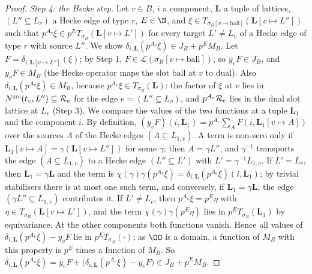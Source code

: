 \begin{proof}
\emph{Step 4: the Hecke step.} Let $v\in B$, $i$ a component, $\mathbf L$ a tuple of lattices, $(L''\subseteq L_v)$ a Hecke edge
of type $r$, $E\in\N$, and $\xi\in T_{\sigma_B[v\mapsto\mathrm{ball}]}(\mathbf L[v\mapsto L''])$ such that
$p^{A_v}\xi\in p^ET_{\sigma_B}(\mathbf L[v\mapsto L'])$ for every target $L'\ne L_v$ of a Hecke edge of type $r$ with source
$L''$. We show $\delta_{i,\mathbf L}(p^{A_v}\xi)\in J_B+p^EM_B$. Let $F=\delta_{i,\mathbf L[v\mapsto L'']}(\xi)$; by Step 1,
$F\in\mathcal L(\sigma_B[v\mapsto\mathrm{ball}])$, so $y_vF\in J_B$, and $y_vF\in M_B$ (the Hecke operator maps the slot
$\mathrm{ball}$ at $v$ to $\mathrm{dual}$). Also $\delta_{i,\mathbf L}(p^{A_v}\xi)\in M_B$, because $p^{A_v}\xi\in
T_{\sigma_B}(\mathbf L)$: the factor of $\xi$ at $v$ lies in $N^{\mathrm{src}}(t_v,L'')\subseteq\mathcal R_e$ for the edge $e=(L''\subseteq
L_v)$, and $p^{A_v}\mathcal R_e$ lies in the dual slot lattice at $L_v$ (Step 3). We compare the values of the two functions at a
tuple $\mathbf L_1$ and the component $i$. By definition,
$(y_vF)(i,\mathbf L_1)=p^{A_v}\sum_AF(i,\mathbf L_1[v\mapsto A])$ over the sources $A$ of the Hecke edges $(A\subseteq L_{1,v})$. A
term is non-zero only if $\mathbf L_1[v\mapsto A]=\gamma(\mathbf L[v\mapsto L''])$ for some $\gamma$; then $A=\gamma L''$, and
$\gamma^{-1}$ transports the edge $(A\subseteq L_{1,v})$ to a Hecke edge $(L''\subseteq L')$ with $L'=\gamma^{-1}L_{1,v}$. If
$L'=L_v$, then $\mathbf L_1=\gamma\mathbf L$ and the term is $\chi(\gamma)\gamma(p^{A_v}\xi)=\delta_{i,\mathbf L}(p^{A_v}\xi)(i,\mathbf L_1)$;
by trivial stabilisers there is at most one such term, and conversely, if $\mathbf L_1=\gamma\mathbf L$, the edge
$(\gamma L''\subseteq L_{1,v})$ contributes it. If $L'\ne L_v$, then $p^{A_v}\xi=p^E\eta$ with $\eta\in T_{\sigma_B}(\mathbf
L[v\mapsto L'])$, and the term $\chi(\gamma)\gamma(p^E\eta)$ lies in $p^ET_{\sigma_B}(\mathbf L_1)$ by equivariance. At the other
components both functions vanish. Hence all
values of $\delta_{i,\mathbf L}(p^{A_v}\xi)-y_vF$ lie in $p^ET_{\sigma_B}(\cdot)$; as $\OO$ is a domain, a function of $M_B$
with this property is $p^E$ times a function of $M_B$. So $\delta_{i,\mathbf L}(p^{A_v}\xi)=y_vF+\bigl(\delta_{i,\mathbf
L}(p^{A_v}\xi)-y_vF\bigr)\in J_B+p^EM_B$.


\end{proof}
